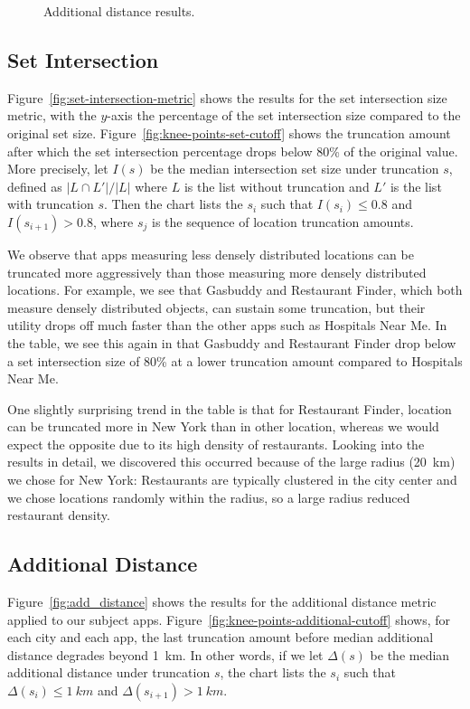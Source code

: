 \documentclass[10pt, conference, compsocconf]{IEEEtran}
\begin{document}
\begin{figure}[t!]
\begin{subfigure}{\textwidth}
  \end{subfigure}

\caption{Additional distance results.}
  
\end{figure}

\subsection{Set Intersection}

Figure~\ref{fig:set-intersection-metric} shows the results for the set
intersection size metric, with the $y$-axis the percentage of the set
intersection size compared to the original set size.
Figure~\ref{fig:knee-points-set-cutoff} shows the truncation amount
after which the set intersection percentage drops below 80\% of the
original value.  More precisely, let $I(s)$ be the median intersection
set size under truncation $s$, defined as $|L \cap L'|/|L|$ where $L$
is the list without truncation and $L'$ is the list with truncation
$s$. Then the chart lists the $s_i$ such that $I(s_i) \leq 0.8$ and
$I(s_{i+1}) > 0.8$, where $s_j$ is the sequence of location truncation amounts.

We observe that apps measuring less densely distributed locations can
be truncated more aggressively than those measuring more densely
distributed locations.
For example, we see that Gasbuddy and Restaurant Finder,
which both measure densely distributed objects,
can sustain some truncation, but their utility drops off much faster than the
other apps such as Hospitals Near Me. In the table, we see this again
in that Gasbuddy and Restaurant Finder drop
below a set intersection size of 80\% at a lower truncation amount compared to Hospitals Near Me.

One slightly surprising trend in the table is that for Restaurant
Finder, location can be truncated more in New York than in other
location, whereas we would expect the opposite due to its
high density of restaurants. Looking into the results in detail, we
discovered this occurred because of the large radius (20~km) we chose
for New York: Restaurants are
typically clustered in the city center and we chose
locations randomly within the radius, so a large radius reduced restaurant
density.

\subsection{Additional Distance}

Figure~\ref{fig:add_distance} shows the results for the additional
distance metric applied to our subject apps.
Figure~\ref{fig:knee-points-additional-cutoff} shows, for each city
and each app, the last truncation amount before median additional
distance degrades beyond 1~km. In other words, if we let
$\Delta(s)$ be the
median additional distance under truncation $s$, the chart lists
the $s_i$ such that $\Delta(s_i) \leq 1~km$ and $\Delta(s_{i+1}) >
1~km$.
\end{document}
